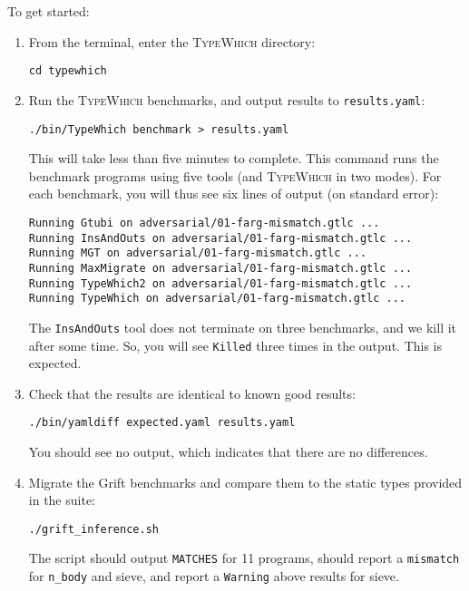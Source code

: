 \documentclass{book}
\newcommand{\system}{\textsc{TypeWhich}\xspace}
\begin{document}
To get started:

\begin{enumerate}
     
\item From the terminal, enter the \system directory:

\begin{verbatim}
cd typewhich
\end{verbatim}

\item Run the \system benchmarks, and output results to \texttt{results.yaml}:

\begin{verbatim}
./bin/TypeWhich benchmark > results.yaml
\end{verbatim}

This will take less than five minutes to complete. This command runs the
benchmark programs using five tools (and \system in two modes). For each
benchmark, you will thus see six lines of output (on standard error):
\begin{verbatim}
Running Gtubi on adversarial/01-farg-mismatch.gtlc ...
Running InsAndOuts on adversarial/01-farg-mismatch.gtlc ...
Running MGT on adversarial/01-farg-mismatch.gtlc ...
Running MaxMigrate on adversarial/01-farg-mismatch.gtlc ...
Running TypeWhich2 on adversarial/01-farg-mismatch.gtlc ...
Running TypeWhich on adversarial/01-farg-mismatch.gtlc ...
\end{verbatim}

The \texttt{InsAndOuts} tool does not terminate on three benchmarks, and
we kill it after some time. So, you will see \texttt{Killed} three times
in the output. This is expected.

\item Check that the results are identical to known good results:

\begin{verbatim}
./bin/yamldiff expected.yaml results.yaml
\end{verbatim}

You should see no output, which indicates that there are no differences.

\item Migrate the Grift benchmarks and compare them to the static types
provided in the suite:

\begin{verbatim}
./grift_inference.sh
\end{verbatim}

The script should output \texttt{MATCHES} for 11 programs, should report a
\texttt{mismatch} for \texttt{n\_body} and sieve, and report a \texttt{Warning} above
results for sieve.

\end{enumerate}
\end{document}
